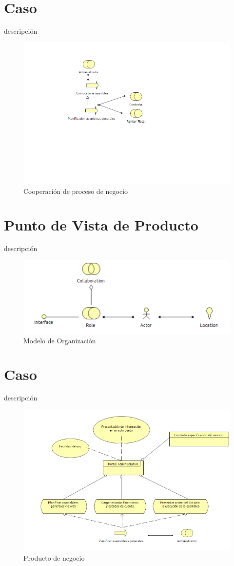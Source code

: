 \newpage
\section{Caso}
descripción

\begin{figure}[th!]
	\centering
	\includegraphics[width=0.7\linewidth]{arquitectura/negocio/imgs/cooperacion-proceso}
	\caption{Cooperación de proceso de negocio}
\end{figure}
\newpage

\section{Punto de Vista de Producto}
descripción


\begin{figure}[th!]
	\centering
	\includegraphics[width=0.7\linewidth]{arquitectura/negocio/imgs/m_organizacion}
	\caption{Modelo de Organización}
\end{figure}

\newpage
\section{Caso}
descripción

\begin{figure}[th!]
	\centering
	\includegraphics[width=0.7\linewidth]{arquitectura/negocio/imgs/producto}
	\caption{Producto de negocio}
\end{figure}
\newpage